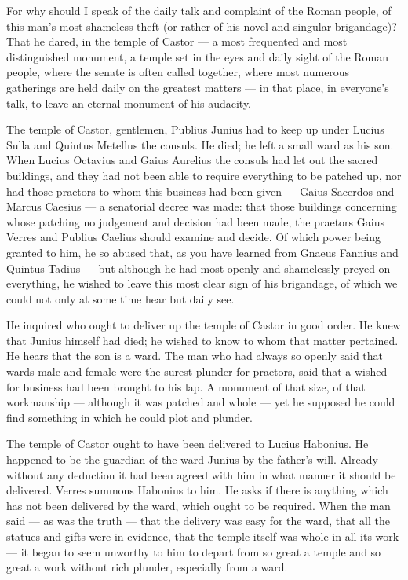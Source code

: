  For why should I speak of the daily talk and complaint of the Roman people, of this man's most shameless theft (or rather of his novel and singular brigandage)? That he dared, in the temple of Castor --- a most frequented and most distinguished monument, a temple set in the eyes and daily sight of the Roman people, where the senate is often called together, where most numerous gatherings are held daily on the greatest matters --- in that place, in everyone's talk, to leave an eternal monument of his audacity.

 The temple of Castor, gentlemen, Publius Junius had to keep up under Lucius Sulla and Quintus Metellus the consuls. He died; he left a small ward as his son. When Lucius Octavius and Gaius Aurelius the consuls had let out the sacred buildings, and they had not been able to require everything to be patched up, nor had those praetors to whom this business had been given --- Gaius Sacerdos and Marcus Caesius --- a senatorial decree was made: that those buildings concerning whose patching no judgement and decision had been made, the praetors Gaius Verres and Publius Caelius should examine and decide. Of which power being granted to him, he so abused that, as you have learned from Gnaeus Fannius and Quintus Tadius --- but although he had most openly and shamelessly preyed on everything, he wished to leave this most clear sign of his brigandage, of which we could not only at some time hear but daily see.

 He inquired who ought to deliver up the temple of Castor in good order. He knew that Junius himself had died; he wished to know to whom that matter pertained. He hears that the son is a ward. The man who had always so openly said that wards male and female were the surest plunder for praetors, said that a wished-for business had been brought to his lap. A monument of that size, of that workmanship --- although it was patched and whole --- yet he supposed he could find something in which he could plot and plunder.

 The temple of Castor ought to have been delivered to Lucius Habonius. He happened to be the guardian of the ward Junius by the father's will. Already without any deduction it had been agreed with him in what manner it should be delivered. Verres summons Habonius to him. He asks if there is anything which has not been delivered by the ward, which ought to be required. When the man said --- as was the truth --- that the delivery was easy for the ward, that all the statues and gifts were in evidence, that the temple itself was whole in all its work --- it began to seem unworthy to him to depart from so great a temple and so great a work without rich plunder, especially from a ward.

